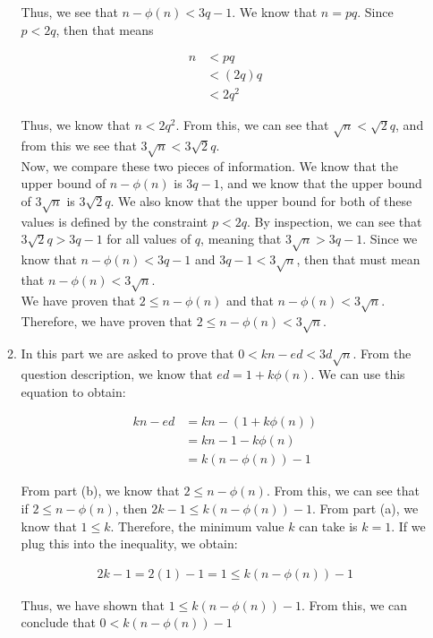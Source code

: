 \documentclass[11pt]{article}
\theoremstyle{definition}
\begin{document}
\begin{enumerate}
\begin{enumerate}
Thus, we see that $n - \phi(n) < 3q - 1$. We know that $n = pq$. Since $p < 2q$, then that means

\begin{align*}
    n &< pq \\
    &< (2q)q \\
    &< 2q^2
\end{align*}

Thus, we know that $n < 2q^2$. From this, we can see that $\sqrt{n} < \sqrt{2}q$, and from this we see that $3\sqrt{n} < 3\sqrt{2}q$. \\

Now, we compare these two pieces of information. We know that the upper bound of $n - \phi(n)$ is $3q - 1$, and we know that the upper bound of $3\sqrt{n}$ is $3\sqrt{2}q$. We also know that the upper bound for both of these values is defined by the constraint $p < 2q$. By inspection, we can see that $3\sqrt{2}q > 3q - 1$ for all values of $q$, meaning that $3\sqrt{n} > 3q - 1$. Since we know that $n - \phi(n) < 3q - 1$ and $3q - 1 < 3\sqrt{n}$, then that must mean that $n - \phi(n) < 3\sqrt{n}$. \\

We have proven that $2 \leq n - \phi(n)$ and that $n - \phi(n) < 3\sqrt{n}$. Therefore, we have proven that $2 \leq n - \phi(n) < 3\sqrt{n}$.
\\

\item %

In this part we are asked to prove that $0 < kn - ed < 3d\sqrt{n}$. From the question description, we know that $ed = 1 + k\phi(n)$. We can use this equation to obtain:

\begin{align*}
    kn - ed &= kn - (1 + k\phi(n)) \\
    &= kn - 1 - k\phi(n) \\
    &= k(n - \phi(n)) - 1
\end{align*}

From part (b), we know that $2 \leq n - \phi(n)$. From this, we can see that if $2 \leq n - \phi(n)$, then $2k - 1 \leq k(n - \phi(n)) - 1$. From part (a), we know that $1 \leq k$. Therefore, the minimum value $k$ can take is $k = 1$. If we plug this into the inequality, we obtain: 

\begin{align*}
    2k - 1 = 2(1) - 1 = 1 \leq k(n - \phi(n)) - 1
\end{align*}

Thus, we have shown that $1 \leq k(n - \phi(n)) - 1$. From this, we can conclude that $0 < k(n - \phi(n)) - 1$ \\


\end{enumerate}
\end{enumerate}
\end{document}
